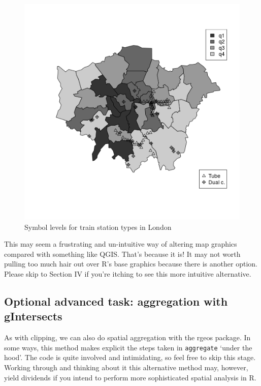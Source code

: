 \documentclass[]{article}
\begin{document}
\begin{figure}[htbp]
\centering
\includegraphics{figure/Symbol_levels_for_train_station_types_in_London.png}
\caption{Symbol levels for train station types in London}
\end{figure}

This may seem a frustrating and un-intuitive way of altering map
graphics compared with something like QGIS. That's because it is! It may
not worth pulling too much hair out over R's base graphics because there
is another option. Please skip to Section IV if you're itching to see
this more intuitive alternative.

\subsection{Optional advanced task: aggregation with
gIntersects}\label{optional-advanced-task-aggregation-with-gintersects}

As with clipping, we can also do spatial aggregation with the rgeos
package. In some ways, this method makes explicit the steps taken in
\texttt{aggregate} `under the hood'. The code is quite involved and
intimidating, so feel free to skip this stage. Working through and
thinking about it this alternative method may, however, yield dividends
if you intend to perform more sophisticated spatial analysis in R.
\end{document}
